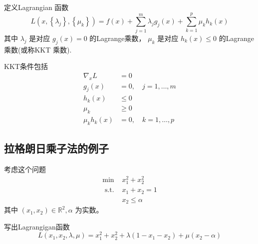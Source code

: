 \begin{theorem}[标准约束优化的KKT条件]
    定义Lagrangian 函数
\begin{equation}
L\left({x},\left\{\lambda_{j}\right\},\left\{\mu_{k}\right\}\right)=f({x})+\sum_{j=1}^{m} \lambda_{j} g_{j}({x})+\sum_{k=1}^{p} \mu_{k} h_{k}({x})
\end{equation}
其中 $ \lambda_{j} $ 是对应 $ g_{j}({x})=0 $ 的Lagrange乘数， $ \mu_{k} $ 是对应 $ h_{k}({x}) \leq 0 $ 的Lagrange乘数(或称KKT 乘数). 

KKT条件包括
\begin{equation}
\begin{aligned}
\nabla_{{x}} L &={0} \\
g_{j}({x}) &=0, \quad j=1, \ldots, m \\
h_{k}({x}) & \leq 0 \\
\mu_{k} & \geq 0 \\
\mu_{k} h_{k}({x}) &=0, \quad k=1, \ldots, p
\end{aligned}
\end{equation}

\end{theorem}

\subsection{拉格朗日乘子法的例子}

\begin{problem}

    考虑这个问题
\begin{equation}
\begin{array}{ll}
\min & x_{1}^{2}+x_{2}^{2} \\
\text { s.t. } & x_{1}+x_{2}=1 \\
& x_{2} \leq \alpha
\end{array}
\end{equation}
其中 $ \left(x_{1}, x_{2}\right) \in \mathbb{R}^{2}, \alpha $ 为实数。
\end{problem}

写出Lagrangigan函数
\begin{equation}
L\left(x_{1}, x_{2}, \lambda, \mu\right)=x_{1}^{2}+x_{2}^{2}+\lambda\left(1-x_{1}-x_{2}\right)+\mu\left(x_{2}-\alpha\right)
\end{equation}

